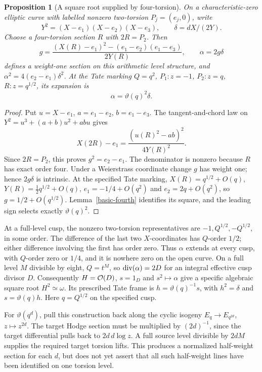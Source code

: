\documentclass[11pt]{article}
\newtheorem{proposition}[theorem]{Proposition}
\theoremstyle{remark}\newtheorem{remark}[theorem]{Remark}
\begin{document}
\begin{proposition}[A square root supplied by four-torsion]\label{level-four-root}
On a characteristic-zero elliptic curve with labelled nonzero two-torsion
$P_j=(e_j,0)$, write
\[
 Y^2=(X-e_1)(X-e_2)(X-e_3),\qquad\delta=dX/(2Y).
\]
Choose a four-torsion section $R$ with $2R=P_2$. Then
\[
 g=\frac{(X(R)-e_1)^2-(e_1-e_2)(e_1-e_3)}{2Y(R)},
 \qquad \alpha=2g\delta
\]
defines a weight-one section on this arithmetic level structure, and
$\alpha^2=4(e_2-e_1)\delta^2$. At the Tate marking
$Q=q^2$, $P_1:z=-1$, $P_2:z=q$, $R:z=q^{1/2}$, its expansion is
\[
 \alpha=\vartheta(q)^2\delta.
\]
\end{proposition}
\begin{proof}
Put $u=X-e_1$, $a=e_1-e_2$, $b=e_1-e_3$. The tangent-and-chord law
on $Y^2=u^3+(a+b)u^2+ab u$ gives
\[
 X(2R)-e_1=\frac{(u(R)^2-ab)^2}{4Y(R)^2}.
\]
Since $2R=P_2$, this proves $g^2=e_2-e_1$. The denominator is nonzero
because $R$ has exact order four. Under a Weierstrass coordinate change
$g$ has weight one; hence $2g\delta$ is intrinsic. At the specified
Tate marking, $X(R)=q^{1/2}+O(q)$,
$Y(R)=\tfrac12q^{1/2}+O(q)$, $e_1=-1/4+O(q^2)$ and
$e_2=2q+O(q^2)$, so $g=1/2+O(q^{1/2})$.
Lemma~\ref{basic-fourth} identifies its square, and the leading sign
selects exactly $\vartheta(q)^2$.
\end{proof}

At a full-level cusp, the nonzero two-torsion representatives are
$-1,Q^{1/2},-Q^{1/2}$, in some order. The difference of the last two
$X$-coordinates has $Q$-order $1/2$; either difference involving the
first has order zero. Thus $\alpha$ extends at every cusp, with
$Q$-order zero or $1/4$, and it is nowhere zero on the open curve.
On a full level $M$ divisible by eight, $Q=t^M$, so
$\operatorname{div}(\alpha)=2D$ for an integral effective cusp divisor $D$.
Consequently $H=\mathcal O(D)$, $s=1_D$ and $s^2\mapsto\alpha$ give a
specific algebraic square root $H^2\simeq\omega$. Its prescribed Tate
frame is $h=\vartheta(q)^{-1}s$, with $h^2=\delta$ and
$s=\vartheta(q)h$. Here $q=Q^{1/2}$ on the specified cusp.

For $\vartheta(q^d)$, pull this construction back along the cyclic
isogeny $E_q\to E_{q^{2d}}$, $z\mapsto z^{2d}$. The target Hodge
section must be multiplied by $(2d)^{-1}$, since the target differential
pulls back to $2d\,d\log z$. A full source level divisible by $2dM$
supplies the required target torsion lifts. This produces a normalized
half-weight section for each $d$, but does not yet assert that all such
half-weight lines have been identified on one torsion level.
\end{document}

